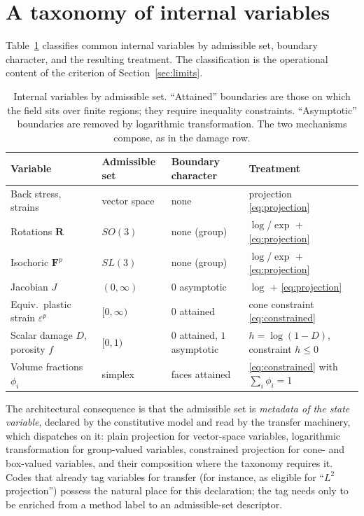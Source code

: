 \documentclass[11pt]{article}
\newcommand{\bs}[1]{\boldsymbol{#1}}
\begin{document}
\section{A taxonomy of internal variables}
\label{sec:taxonomy}

Table~\ref{tab:taxonomy} classifies common internal variables by
admissible set, boundary character, and the resulting treatment. The
classification is the operational content of the criterion of
Section~\ref{sec:limits}.

\begin{table}[htbp]
\centering
\small
\begin{tabular}{llll}
\toprule
Variable & Admissible set & Boundary character & Treatment \\
\midrule
Back stress, strains & vector space & none & projection \eqref{eq:projection} \\
Rotations $\bs{R}$ & $SO(3)$ & none (group) & $\log$/$\exp$ + \eqref{eq:projection} \\
Isochoric $\bs{F}^p$ & $SL(3)$ & none (group) & $\log$/$\exp$ + \eqref{eq:projection} \\
Jacobian $J$ & $(0,\infty)$ & $0$ asymptotic & $\log$ + \eqref{eq:projection} \\
Equiv.\ plastic strain $\varepsilon^p$ & $[0,\infty)$ & $0$ attained & cone constraint \eqref{eq:constrained} \\
Scalar damage $D$, porosity $f$ & $[0,1)$ & $0$ attained, $1$ asymptotic &
$h = \log(1-D)$, constraint $h \leq 0$ \\
Volume fractions $\phi_i$ & simplex & faces attained &
\eqref{eq:constrained} with $\sum_i \phi_i = 1$ \\
\bottomrule
\end{tabular}
\caption{Internal variables by admissible set. ``Attained'' boundaries
are those on which the field sits over finite regions; they require
inequality constraints. ``Asymptotic'' boundaries are removed by
logarithmic transformation. The two mechanisms compose, as in the damage
row.}
\label{tab:taxonomy}
\end{table}

The architectural consequence is that the admissible set is
\emph{metadata of the state variable}, declared by the constitutive model
and read by the transfer machinery, which dispatches on it: plain
projection for vector-space variables, logarithmic transformation for
group-valued variables, constrained projection for cone- and box-valued
variables, and their composition where the taxonomy requires it. Codes
that already tag variables for transfer (for instance, as eligible for
``$L^2$ projection'') possess the natural place for this declaration; the
tag needs only to be enriched from a method label to an admissible-set
descriptor.
\end{document}
